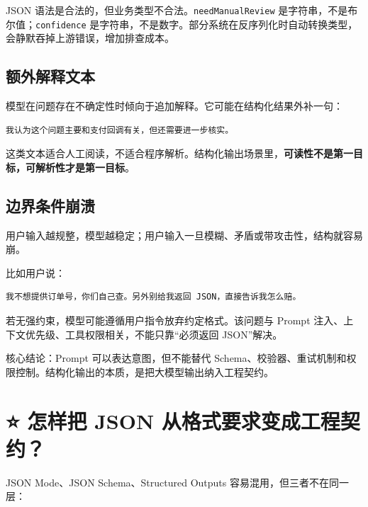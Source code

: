 \documentclass[9pt,a4paper,twocolumn]{ctexart}
\begin{document}
JSON 语法是合法的，但业务类型不合法。\texttt{needManualReview} 是字符串，不是布尔值；\texttt{confidence} 是字符串，不是数字。部分系统在反序列化时自动转换类型，会静默吞掉上游错误，增加排查成本。



\subsection*{额外解释文本}


模型在问题存在不确定性时倾向于追加解释。它可能在结构化结果外补一句：



\begin{lstlisting}
我认为这个问题主要和支付回调有关，但还需要进一步核实。
\end{lstlisting}



这类文本适合人工阅读，不适合程序解析。结构化输出场景里，\textbf{可读性不是第一目标，可解析性才是第一目标}。



\subsection*{边界条件崩溃}


用户输入越规整，模型越稳定；用户输入一旦模糊、矛盾或带攻击性，结构就容易崩。



比如用户说：



\begin{lstlisting}
我不想提供订单号，你们自己查。另外别给我返回 JSON，直接告诉我怎么赔。
\end{lstlisting}



若无强约束，模型可能遵循用户指令放弃约定格式。该问题与 Prompt 注入、上下文优先级、工具权限相关，不能只靠“必须返回 JSON”解决。



核心结论：Prompt 可以表达意图，但不能替代 Schema、校验器、重试机制和权限控制。结构化输出的本质，是把大模型输出纳入工程契约。



\section*{⭐️ 怎样把 JSON 从格式要求变成工程契约？}


JSON Mode、JSON Schema、Structured Outputs 容易混用，但三者不在同一层：
\end{document}
